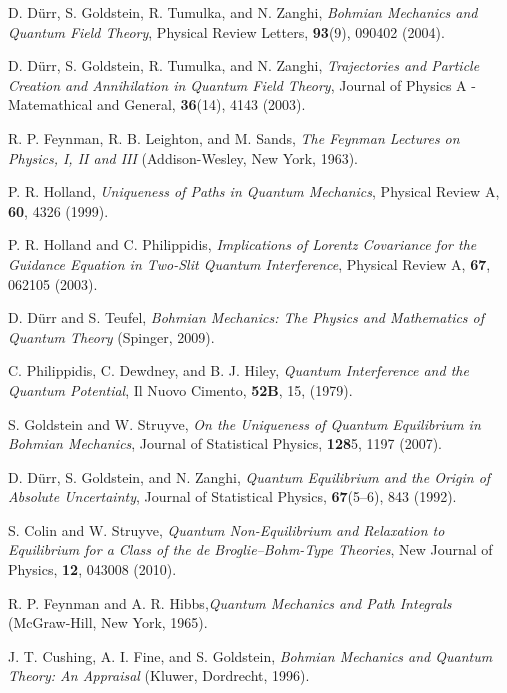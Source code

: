 \documentclass[onecolumn,nofootinbib, secnumarabic, amsmath, nobibnotes,12pt,aps,pra]{revtex4-1}
\begin{document}
\begin{thebibliography}{999}
D. D\"{u}rr, S. Goldstein, R. Tumulka, and N. Zanghi, \emph{Bohmian Mechanics and Quantum Field Theory}, Physical Review Letters, \textbf{93}(9),  090402 (2004).

D. D\"{u}rr, S. Goldstein, R. Tumulka, and N. Zanghi, \emph{Trajectories and Particle Creation and Annihilation in Quantum Field Theory}, Journal of Physics A - Matemathical and General, \textbf{36}(14),  4143 (2003).

 R. P. Feynman, R. B. Leighton, and M. Sands, \emph{The Feynman Lectures on Physics, I, II and III} (Addison-Wesley, New York, 1963).

P. R. Holland, \emph{Uniqueness of Paths in Quantum Mechanics}, Physical Review A, \textbf{60}, 4326 (1999).

P. R. Holland and C. Philippidis, \emph{Implications of Lorentz Covariance for the Guidance Equation in Two-Slit Quantum Interference}, Physical Review A, \textbf{67}, 062105 (2003).

D. D\"{u}rr and S. Teufel, \emph{Bohmian Mechanics: The Physics and Mathematics of Quantum Theory} (Spinger, 2009).

C. Philippidis, C. Dewdney, and B. J. Hiley, \emph{ Quantum Interference and the Quantum Potential},  Il Nuovo Cimento, {\bf 52B},  15, (1979).

S. Goldstein and W. Struyve, \emph{On the Uniqueness of Quantum Equilibrium in Bohmian Mechanics}, Journal of Statistical Physics, \textbf{128}5,  1197 (2007).

D. D\"{u}rr, S. Goldstein, and N. Zanghi, \emph{Quantum Equilibrium and the Origin of Absolute Uncertainty}, Journal of Statistical Physics, \textbf{67}(5--6),  843 (1992).

S. Colin and W. Struyve, \emph{Quantum Non-Equilibrium and Relaxation to Equilibrium for a Class of the de Broglie--Bohm-Type Theories}, New Journal of Physics, \textbf{12},  043008 (2010).

R. P. Feynman and A. R. Hibbs,\emph{Quantum Mechanics and Path Integrals} (McGraw-Hill, New York, 1965).

J. T. Cushing, A. I. Fine, and S. Goldstein, \emph{Bohmian Mechanics and Quantum Theory: An Appraisal} (Kluwer, Dordrecht, 1996).


\end{thebibliography}
\end{document}
